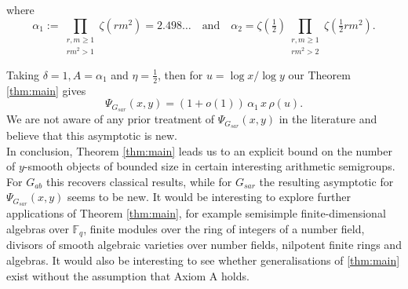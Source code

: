 \documentclass[a4paper]{amsart}
\begin{document}
where $$\alpha_1 := \prod_{\substack{r,m\geq 1\\ rm^2>1}}\zeta(rm^2) = 2.498\dots \quad \text{and} \quad \alpha_2 = \zeta(\tfrac12)\prod_{\substack{r,m\geq 1\\ rm^2>2}}\zeta(\tfrac12 rm^2).$$

Taking $\delta =1, A = \alpha_1$ and $\eta = \frac{1}{2}$, then for $u = \log{x}/\log{y}$ our Theorem \ref{thm:main} gives
$$\Psi_{G_{sar}}(x,y) = (1+o(1))\,\alpha_1\,x\,\rho(u).$$
 We are not aware of any prior treatment of $\Psi_{G_{sar}}(x,y)$ in the literature and believe that this asymptotic is new.\\

In conclusion, Theorem \ref{thm:main} leads us to an explicit bound on the
number of $y$-smooth objects of bounded size in certain interesting arithmetic semigroups. For $G_{ab}$ this recovers classical results, while
for $G_{sar}$ the resulting
asymptotic for $\Psi_{G_{sar}}(x,y)$ seems to be new. It would be interesting to explore further applications of Theorem \ref{thm:main}, for example semisimple finite-dimensional algebras over $\mathbb{F}_q$, finite modules over the ring of integers of a number field, divisors of smooth algebraic varieties over number fields, nilpotent finite rings and algebras. It would also be interesting to see whether generalisations of \ref{thm:main} exist without the assumption that Axiom A holds. 





%
%
\end{document}
